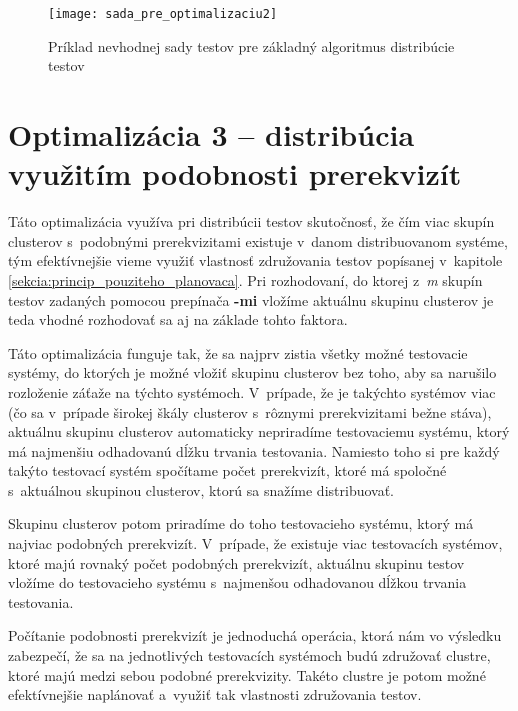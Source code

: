 \begin{figure}[h]
  \begin{center}
    \texttt{[image: sada\_pre\_optimalizaciu2]}
    \caption{Príklad nevhodnej sady testov pre základný algoritmus 
             distribúcie testov}
    \label{obrazok:sada_pre_optimalizaciu2}
  \end{center}
\end{figure}



\section{Optimalizácia 3 -- distribúcia využitím podobnosti prerekvizít}
\label{sekcia:optimalizacia3}
Táto optimalizácia využíva pri distribúcii testov skutočnosť, že čím viac
skupín clusterov s~podobnými prerekvizitami existuje v~danom 
distribuovanom systéme, tým efektívnejšie vieme využiť vlastnosť 
združovania testov popísanej v~kapitole 
\ref{sekcia:princip_pouziteho_planovaca}.
Pri rozhodovaní, do ktorej z~\textit{m} skupín testov zadaných pomocou 
prepínača \textbf{-mi} vložíme aktuálnu skupinu clusterov je teda vhodné 
rozhodovať sa aj na základe tohto faktora.

Táto optimalizácia funguje tak, že sa najprv zistia všetky možné 
testovacie systémy, do ktorých je možné vložiť skupinu clusterov bez toho, 
aby sa narušilo rozloženie záťaže na týchto systémoch. 
V~prípade, že je takýchto systémov viac (čo sa v~prípade širokej škály 
clusterov s~rôznymi prerekvizitami bežne stáva),
aktuálnu skupinu clusterov automaticky nepriradíme testovaciemu systému, 
ktorý má najmenšiu odhadovanú dĺžku trvania testovania. 
Namiesto toho si pre každý takýto testovací systém spočítame počet 
prerekvizít, ktoré má spoločné s~aktuálnou skupinou clusterov, ktorú 
sa snažíme distribuovať. 

Skupinu clusterov potom priradíme do toho testovacieho systému, ktorý 
má najviac podobných prerekvizít. V~prípade, že existuje viac 
testovacích systémov, ktoré majú rovnaký počet podobných prerekvizít, 
aktuálnu skupinu testov vložíme do testovacieho systému s~najmenšou
odhadovanou dĺžkou trvania testovania.

Počítanie podobnosti prerekvizít je jednoduchá operácia, ktorá nám vo 
výsledku zabezpečí, že sa na jednotlivých testovacích systémoch budú 
združovať clustre, ktoré majú medzi sebou podobné prerekvizity. 
Takéto clustre je potom možné efektívnejšie naplánovať a~využiť tak 
vlastnosti združovania testov.

